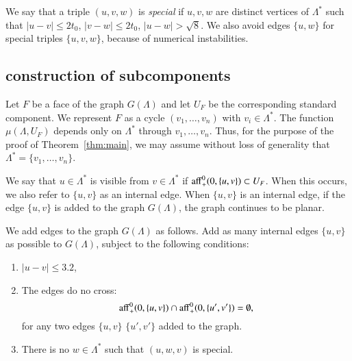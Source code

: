 We say that a triple $(u,v,w)$ is {\it special}
if $u,v,w$ are distinct vertices of $\Lambda^*$ such
that $|u-v|\le 2t_0$, $|v-w|\le 2t_0$, $|u-w|>\sqrt8$.
We also avoid edges $\{u,w\}$ for special triples $\{u,v,w\}$,
because of numerical instabilities.


\subsection{construction of subcomponents}

Let $F$ be a face of the graph $G(\Lambda)$ and let $U_F$ be the
corresponding standard component.  We represent $F$ as a cycle
$(v_1,\ldots,v_n)$ with $v_i\in\Lambda^*$.  The function
$\mu(\Lambda,U_F)$ depends only on $\Lambda^*$ through
$v_1,\ldots,v_n$.  Thus, for the purpose of the proof of
Theorem~\ref{thm:main}, we may assume without loss of generality
that $\Lambda^* = \{v_1,\ldots,v_n\}$.

We say that $u\in\Lambda^*$ is visible from $v\in\Lambda^*$ if
${\operatorname{aff}}_+^0(0,\{u,v\})\subset U_F$.  When this occurs, we
also refer to $\{u,v\}$ as an internal edge.  When $\{u,v\}$
is an internal edge, if the edge $\{u,v\}$ is added to the
graph $G(\Lambda)$, the graph continues to be planar.



We add edges to the graph $G(\Lambda)$ 
as follows.  
Add as many internal edges $\{u,v\}$ as possible to $G(\Lambda)$, subject
to the following conditions:
\begin{enumerate}
\item  $|u-v|\le3.2$, 
\item The edges do no cross:
  \begin{equation}\label{eqn:nonc}
  {\operatorname{aff}}_+^0(0,\{u,v\}) \cap {\operatorname{aff}}_+^0(0,\{u',v'\}) = \emptyset,
  \end{equation}
for any two edges $\{u,v\}$ $\{u',v'\}$ added to the graph.
\item There is no $w\in\Lambda^*$ such that $(u,w,v)$ is special.
\end{enumerate}  

